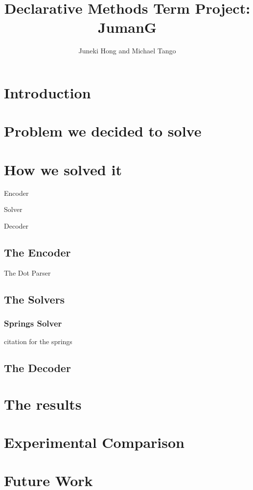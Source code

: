 \documentclass{article}
\author{Juneki Hong and Michael Tango}
\title{Declarative Methods Term Project: \\ JumanG}
\begin{document}
\maketitle
\newpage


\section{Introduction}

\section{Problem we decided to solve}


\section{How we solved it}

Encoder

Solver

Decoder

\subsection{The Encoder}
The Dot Parser


\subsection{The Solvers}



\subsubsection{Springs Solver}
citation for the springs\cite{springs}


\subsection{The Decoder}


\section{The results}

\section{Experimental Comparison}


\section{Future Work}




\end{document}
